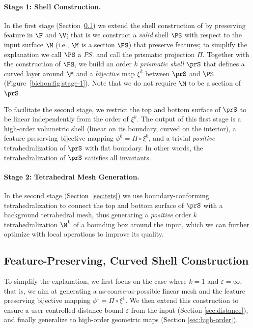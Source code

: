 \paragraph{Stage 1: Shell Construction.}
In the first stage (Section~\ref{sec:surface}) we extend the shell construction of \cite{jiang2020bijective} by preserving feature in $\F$ and $\V$; that is we construct a \emph{valid} shell $\PS$ with respect to the input surface $\M$ (i.e., $\M$ is a section $\PS$) that preserve features; to simplify the explanation we call $\PS$ a \emph{\ps{}} and call the prismatic projection $\Pi$. Together with the construction of $\PS$, we build an order $k$ \emph{prismatic shell} $\prS$ that defines a curved layer around $\M$ and a \emph{bijective} map $\xi^k$ between $\prS$ and $\PS$ (Figure~\ref{bichon:fig:stage-1}). Note that we do not require $\M$ to be a section of $\prS$.

To facilitate the second stage, we restrict the top and bottom surface of $\prS$ to be linear independently from the order of $\xi^k$. The output of this first stage is a high-order volumetric shell (linear on its boundary, curved on the interior), a feature preserving bijective mapping $\phi^k = \Pi \circ \xi^k$, and a trivial \emph{positive} tetrahedralization of $\prS$ with flat boundary. In other words, the tetrahedralization of $\prS$ satisfies all invariants.

\paragraph{Stage 2: Tetrahedral Mesh Generation.}
In the second stage (Section~\ref{sec:tets}) we use boundary-conforming tetrahedralization to connect the top and bottom surface of $\prS$ with a background tetrahedral mesh, thus generating a \emph{positive} order $k$ tetrahedralization $\M^k$ of a bounding box around the input, which we can further optimize with local operations to improve its quality. %



\subsection{Feature-Preserving, Curved Shell Construction}\label{sec:surface}
To simplify the explanation, we first focus on the case where $k=1$ and $\varepsilon = \infty$, that is, we aim at generating a as-coarse-as-possible linear mesh and the feature preserving bijective mapping $\phi^1 = \Pi \circ \xi^1$. We then extend this construction to ensure a user-controlled distance bound $\varepsilon$ from the input (Section \ref{sec:distance}), and finally generalize to high-order geometric maps (Section \ref{sec:high-order}).

